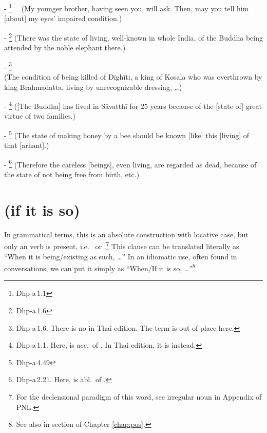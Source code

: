 - \footnote{Dhp-a\,1.1} \ \ (My younger brother, having seen you, will ask. Then, may you tell him [about] my eyes' impaired condition.)\par
- \footnote{Dhp-a\,1.6} (There was the state of living, well-known in whole India, of the Buddha being attended by the noble elephant there.)\par
- \footnote{Dhp-a\,1.6. There is no  in Thai edition. The term is out of place here.} \\(The condition of being killed of D\=igh\=iti, a king of Kosala who was overthrown by king Brahmadatta, living by unrecognizable dressing, \ldots)\par
- \footnote{Dhp-a\,1.1. Here,  is acc.\ of . In Thai edition, it is  instead.} ([The Buddha] has lived in S\=avatth\=i for 25 years because of the [state of] great virtue of two families.)\par
- \footnote{Dhp-a\,4.49} (The state of making honey by a bee should be known [like] this [living] of that [arhant].)\par
- \footnote{Dhp-a\,2.21. Here,  is abl.\ of .} (Therefore the careless [beings], even living, are regarded as dead, because of the state of not being free from birth, etc.)\par

{}
\section*{ (if it is so)}

In grammatical terms, this is an absolute construction with locative case, but only an  verb is present, i.e.\  or .\footnote{For the declensional paradigm of this word, see irregular noun  in Appendix  of PNL.} This clause can be translated literally as ``When it is being/existing as such, \ldots'' In an idiomatic use, often found in conversations, we can put it simply as ``When/If it is so, \ldots''\footnote{See also  in  section of Chapter \ref{chap:pos}.}

